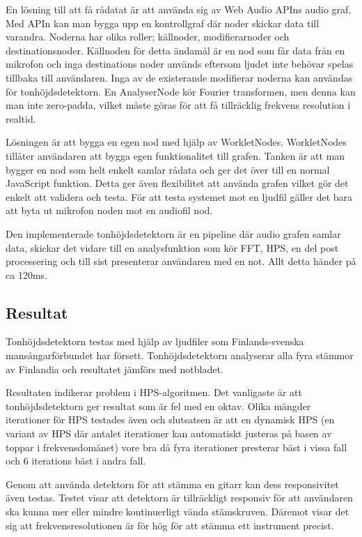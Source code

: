 En lösning till att få rådatat är att använda sig av Web Audio APIns audio graf. Med APIn kan man bygga upp en kontrollgraf där noder skickar data till varandra. Noderna har olika roller; källnoder, modifierarnoder och destinationsnoder. Källnoden för detta ändamål är en nod som får data från en mikrofon och inga destinations noder används eftersom ljudet inte behövar spelas tillbaka till användaren. Inga av de existerande modifierar noderna kan användas för tonhöjdsdetektorn. En AnalyserNode kör Fourier transformen, men denna kan man inte zero-padda, vilket måste göras för att få tillräcklig frekvens resolution i realtid. 

Lösningen är att bygga en egen nod med hjälp av WorkletNodes. WorkletNodes tillåter användaren att bygga egen funktionalitet till grafen. Tanken är att man bygger en nod som helt enkelt samlar rådata och ger det över till en normal JavaScript funktion. Detta ger även flexibilitet att använda grafen vilket gör det enkelt att validera och testa. För att testa systemet mot en ljudfil gäller det bara att byta ut mikrofon noden mot en audiofil nod.  

Den implementerade tonhöjdsdetektorn är en pipeline där audio grafen samlar data, skickar det vidare till en analysfunktion som kör FFT, HPS, en del post processering och till sist presenterar användaren med en not. Allt detta händer på ca 120ms. 

\subsection*{Resultat}
Tonhöjdsdetektorn testas med hjälp av ljudfiler som Finlands-svenska \linebreak mansångarförbundet har försett. Tonhöjdsdetektorn analyserar alla fyra stämmor av Finlandia och resultatet jämförs med notbladet. 

Resultaten indikerar problem i HPS-algoritmen. Det vanligaste är att \linebreak tonhöjdsdetektorn ger resultat som är fel med en oktav. Olika mängder iterationer för HPS testades även och slutsatsen är att en dynamisk HPS (en variant av HPS där antalet iterationer kan automatiskt justeras på basen av toppar i frekvensdomänet) vore bra då fyra iterationer presterar bäst i vissa fall och 6 iterations bäst i andra fall.

Genom att använda detektorn för att stämma en gitarr kan dess responsivitet även testas. Testet visar att detektorn är tillräckligt responsiv för att användaren ska kunna mer eller mindre kontinuerligt vända stämskruven. Däremot visar det sig att frekvensresolutionen är för hög för att stämma ett instrument precist. 

